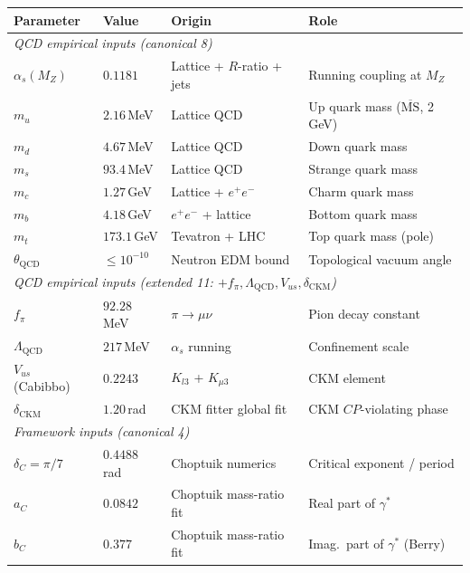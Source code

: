 \documentclass[11pt,a4paper]{article}
\newcommand{\dC}{\delta_C}
\theoremstyle{plain}
\theoremstyle{definition}
\theoremstyle{remark}
\begin{document}
\begin{table}[h]
\centering
\small
\begin{tabular}{l l l l}
\toprule
Parameter & Value & Origin & Role \\
\midrule
\multicolumn{4}{l}{\emph{QCD empirical inputs (canonical 8)}} \\
$\alpha_s(M_Z)$       & $0.1181$           & Lattice + $R$-ratio + jets & Running coupling at $M_Z$ \\
$m_u$                 & $2.16\,$MeV        & Lattice QCD                & Up quark mass ($\overline{\text{MS}}$, 2 GeV) \\
$m_d$                 & $4.67\,$MeV        & Lattice QCD                & Down quark mass \\
$m_s$                 & $93.4\,$MeV        & Lattice QCD                & Strange quark mass \\
$m_c$                 & $1.27\,$GeV        & Lattice + $e^+e^-$         & Charm quark mass \\
$m_b$                 & $4.18\,$GeV        & $e^+e^-$ + lattice         & Bottom quark mass \\
$m_t$                 & $173.1\,$GeV       & Tevatron + LHC             & Top quark mass (pole) \\
$\theta_{\mathrm{QCD}}$ & $\le 10^{-10}$    & Neutron EDM bound          & Topological vacuum angle \\
\midrule
\multicolumn{4}{l}{\emph{QCD empirical inputs (extended 11: $+ f_\pi, \Lambda_{\mathrm{QCD}}, V_{us}, \delta_{\mathrm{CKM}}$)}} \\
$f_\pi$               & $92.28\,$MeV       & $\pi \to \mu\nu$           & Pion decay constant \\
$\Lambda_{\mathrm{QCD}}$ & $217\,$MeV      & $\alpha_s$ running        & Confinement scale \\
$V_{us}$ (Cabibbo)    & $0.2243$           & $K_{l3}$ + $K_{\mu 3}$     & CKM element \\
$\delta_{\mathrm{CKM}}$ & $1.20\,$rad       & CKM fitter global fit     & CKM $CP$-violating phase \\
\midrule
\multicolumn{4}{l}{\emph{Framework inputs (canonical 4)}} \\
$\dC = \pi/7$         & $0.4488\,$rad      & Choptuik numerics          & Critical exponent / period \\
$a_C$                 & $0.0842$           & Choptuik mass-ratio fit    & Real part of $\gamma^\ast$ \\
$b_C$                 & $0.377$            & Choptuik mass-ratio fit    & Imag.\ part of $\gamma^\ast$ (Berry) \\

\end{tabular}
\end{table}
\end{document}
